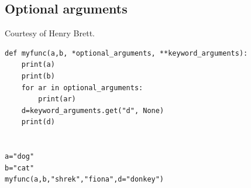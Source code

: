 \subsection{Optional arguments}

Courtesy of Henry Brett.

\begin{lstlisting}
def myfunc(a,b, *optional_arguments, **keyword_arguments):
    print(a)
    print(b)
    for ar in optional_arguments:
        print(ar)
    d=keyword_arguments.get("d", None)
    print(d)
    

a="dog"
b="cat"
myfunc(a,b,"shrek","fiona",d="donkey")
\end{lstlisting}








